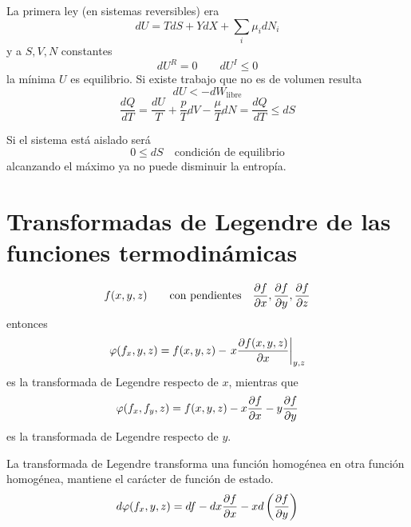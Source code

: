 \documentclass[10pt,oneside]{CBFT_book}
\begin{document}
La primera ley (en sistemas reversibles) era 
\[
	dU = TdS + YdX + \sum_i \mu_i dN_i
\]
y a $S,V,N$ constantes 
\[
	dU^R = 0 \qquad dU^I \leq 0
\]
la mínima $U$ es equilibrio.
Si existe trabajo que no es de volumen resulta 
\[
	dU < -dW_\text{libre}
\]
\[
	\frac{dQ}{dT} = \frac{dU}{T} + \frac{p}{T}dV - \frac{\mu}{T}dN = \frac{dQ}{dT} \leq dS
\]

Si el sistema está aislado será
\[
	0 \leq dS \quad \text{condición de equilibrio}
\]
alcanzando el máximo ya no puede disminuir la entropía.


\section{Transformadas de Legendre de las funciones termodinámicas}

\[
	f(x,y,z) \qquad \text{con pendientes} \quad \frac{\partial^{\hspace{-0.05em}} {f}}{\partial {x}^{\hspace{-0.05em}}},\frac{\partial^{\hspace{-0.05em}} {f}}{\partial {y}^{\hspace{-0.05em}}},\frac{\partial^{\hspace{-0.05em}} {f}}{\partial {z}^{\hspace{-0.05em}}}
\]
entonces 
\[
	\varphi(f_x,y,z) = f(x,y,z) - \left. x \frac{\partial^{\hspace{-0.05em}} {f(x,y,z)}}{\partial {x}^{\hspace{-0.05em}}}\right|_{y,z}
\]
es la transformada de Legendre respecto de $x$, mientras que 
\[
	\varphi(f_x,f_y,z) = f(x,y,z) - x \frac{\partial^{\hspace{-0.05em}} {f}}{\partial {x}^{\hspace{-0.05em}}} - y \frac{\partial^{\hspace{-0.05em}} {f}}{\partial {y}^{\hspace{-0.05em}}}
\]
es la transformada de Legendre respecto de $y$.

La transformada de Legendre transforma una función homogénea en otra función homogénea, mantiene el
carácter de función de estado.
\[
	d\varphi(f_x,y,z) = df - dx \frac{\partial^{\hspace{-0.05em}} {f}}{\partial {x}^{\hspace{-0.05em}}} - x d\left( \frac{\partial^{\hspace{-0.05em}} {f}}{\partial {y}^{\hspace{-0.05em}}} \right)
\]
\end{document}

